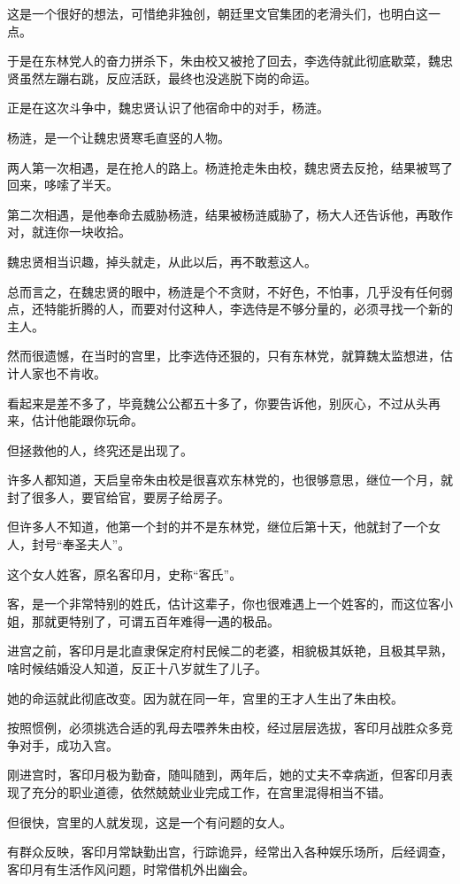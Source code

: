 \begin{multicols}{\theparacolNo}
		这是一个很好的想法，可惜绝非独创，朝廷里文官集团的老滑头们，也明白这一点。

		于是在东林党人的奋力拼杀下，朱由校又被抢了回去，李选侍就此彻底歇菜，魏忠贤虽然左蹦右跳，反应活跃，最终也没逃脱下岗的命运。

		正是在这次斗争中，魏忠贤认识了他宿命中的对手，杨涟。

		杨涟，是一个让魏忠贤寒毛直竖的人物。

		两人第一次相遇，是在抢人的路上。杨涟抢走朱由校，魏忠贤去反抢，结果被骂了回来，哆嗦了半天。

		第二次相遇，是他奉命去威胁杨涟，结果被杨涟威胁了，杨大人还告诉他，再敢作对，就连你一块收拾。

		魏忠贤相当识趣，掉头就走，从此以后，再不敢惹这人。

		总而言之，在魏忠贤的眼中，杨涟是个不贪财，不好色，不怕事，几乎没有任何弱点，还特能折腾的人，而要对付这种人，李选侍是不够分量的，必须寻找一个新的主人。

		然而很遗憾，在当时的宫里，比李选侍还狠的，只有东林党，就算魏太监想进，估计人家也不肯收。

		看起来是差不多了，毕竟魏公公都五十多了，你要告诉他，别灰心，不过从头再来，估计他能跟你玩命。

		但拯救他的人，终究还是出现了。

		许多人都知道，天启皇帝朱由校是很喜欢东林党的，也很够意思，继位一个月，就封了很多人，要官给官，要房子给房子。

		但许多人不知道，他第一个封的并不是东林党，继位后第十天，他就封了一个女人，封号“奉圣夫人”。

		这个女人姓客，原名客印月，史称“客氏”。

		客，是一个非常特别的姓氏，估计这辈子，你也很难遇上一个姓客的，而这位客小姐，那就更特别了，可谓五百年难得一遇的极品。

		进宫之前，客印月是北直隶保定府村民候二的老婆，相貌极其妖艳，且极其早熟，啥时候结婚没人知道，反正十八岁就生了儿子。

		她的命运就此彻底改变。因为就在同一年，宫里的王才人生出了朱由校。

		按照惯例，必须挑选合适的乳母去喂养朱由校，经过层层选拔，客印月战胜众多竞争对手，成功入宫。

		刚进宫时，客印月极为勤奋，随叫随到，两年后，她的丈夫不幸病逝，但客印月表现了充分的职业道德，依然兢兢业业完成工作，在宫里混得相当不错。

		但很快，宫里的人就发现，这是一个有问题的女人。

		有群众反映，客印月常缺勤出宫，行踪诡异，经常出入各种娱乐场所，后经调查，客印月有生活作风问题，时常借机外出幽会。


\end{multicols}
